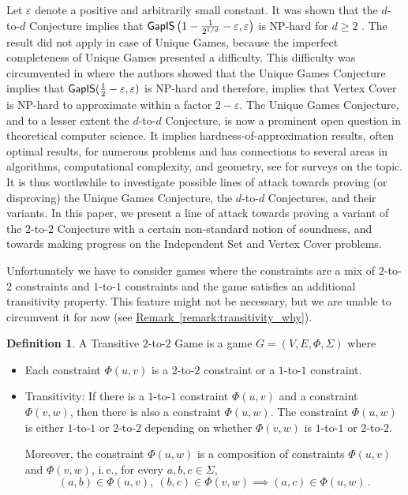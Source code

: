 \documentclass[11pt]{article}
\numberwithin{equation}{section}
\theoremstyle{definition}
\newtheorem{definition}[theorem]{Definition}
\theoremstyle{plain}
\newcommand{\ie}{i.\,e.}
\newcommand{\expref}[2]{\hyperref[#2]{#1~\ref{#2}}}
\newcommand\eps{\varepsilon}
\begin{document}
Let $\eps$ denote a positive and arbitrarily small constant.
It was shown that the $d$-to-$d$ Conjecture implies that ${\sf GapIS} \left(1-\frac{1}{2^{1/d}}-\eps, \eps\right)$ is NP-hard for $d \geqslant 2$ \cite{Khot02}. The result did not
apply in  case of Unique Games,
because the imperfect completeness of Unique Games presented a difficulty.
This difficulty was circumvented in \cite{KR08} where the
authors showed that the Unique Games Conjecture implies that ${\sf GapIS} (\frac{1}{2}-\eps, \eps)$ is NP-hard and therefore, implies that Vertex Cover is NP-hard to approximate
 within a factor $2-\eps$.
The Unique Games Conjecture, and to a lesser extent the $d$-to-$d$ Conjecture, is now a prominent open question in theoretical computer science.
It implies hardness-of-approximation results, often optimal results, for numerous problems and has connections to several areas in algorithms, computational complexity,
and geometry, see \cite{Trevisan-survey, KhotUGC-survey, KhotICM-survey} for surveys on the topic.  It is thus worthwhile to investigate possible lines of attack towards
proving (or disproving) the Unique Games Conjecture, the $d$-to-$d$ Conjectures,
and their variants. In this paper, we
present a line of attack towards proving a variant of the
 $2$-to-$2$  Conjecture with a certain non-standard notion of soundness,
and towards making progress
on the Independent Set and Vertex Cover problems.



Unfortunately we have to consider games where the constraints are a mix of $2$-to-$2$ constraints and $1$-to-$1$ constraints and
the
game satisfies an additional transitivity property. This feature might not be necessary, but we are unable to circumvent it for now
(see \expref{Remark}{remark:transitivity_why}).

\begin{definition}\label{def:trans_game}
A Transitive $2$-to-$2$ Game is a game $G=(V,E,\Phi,\Sigma)$ where
\begin{itemize}
\item Each constraint $\Phi(u,v)$ is a $2$-to-$2$ constraint or a $1$-to-$1$ constraint.
\item Transitivity: If there is a $1$-to-$1$ constraint $\Phi(u,v)$ and a constraint $\Phi(v,w)$, then there is also a constraint $\Phi(u,w)$. The constraint
      $\Phi(u,w)$ is either
  $1$-to-$1$ or $2$-to-$2$ depending on whether $\Phi(v,w)$ is $1$-to-$1$ or
  $2$-to-$2$. %
%

  Moreover, the constraint $\Phi(u,w)$
is a composition of constraints $\Phi(u,v)$ and $\Phi(v,w)$, \ie, for every $a,b,c \in \Sigma$,
$$ (a,b) \in \Phi(u,v), \ (b,c) \in  \Phi(v,w) \implies (a,c) \in \Phi(u,w)\,. $$%
\end{itemize}
\end{definition}
\end{document}
